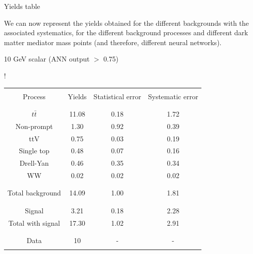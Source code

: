\documentclass[handout,8 pt]{beamer}
\begin{document}
\begin{frame}{Yields table}

	\justifying 
	We can now represent the yields obtained for the different backgrounds with the associated systematics, for the different background processes and different dark matter mediator mass points (and therefore, different neural networks). \vfill
	
	\begin{minipage}[c]{.48\linewidth}
	
	\begin{center}
	
	\begin{exampleblock}{}{ \begin{center} 10 GeV scalar (ANN output $>$ 0.75) \end{center}} \end{exampleblock} \vspace{6pt}
	
	\resizebox{170pt} {!}{
	\begin{tabular}{c|c|c|c}
	 	& & & \\
		Process & Yields & Statistical error & Systematic error \\
		& & & \\
		\hline \hline
		& & & \\
		$t \bar t$ & 11.08 & 0.18 & 1.72 \\
		Non-prompt & 1.30 & 0.92 & 0.39 \\
		ttV & 0.75 & 0.03 & 0.19 \\
		Single top & 0.48 & 0.07 & 0.16 \\
		Drell-Yan & 0.46 & 0.35 & 0.34 \\
		WW & 0.02 & 0.02 & 0.02 \\
		& & & \\
		\hline
		& & & \\
		Total background & 14.09 & 1.00 & 1.81 \\
		& & & \\
		\hline
		& & & \\
		Signal & 3.21 & 0.18 & 2.28 \\
		Total with signal & 17.30 & 1.02 & 2.91 \\
		& & & \\
		\hline
		& & & \\
		Data & 10 & - & - \\
		& & & \\
	\end{tabular}
	} 
	
	\end{center}


\end{minipage}
\end{frame}
\end{document}
